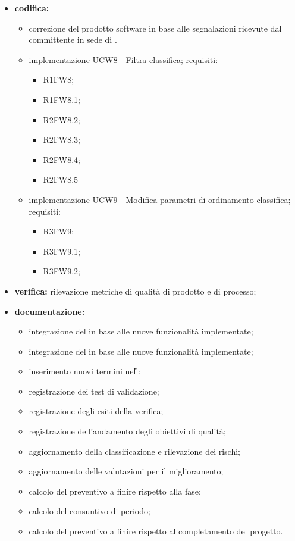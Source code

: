 \begin{itemize}
	\item \textbf{codifica:}
			\begin{itemize}
				\item correzione del prodotto software in base alle segnalazioni ricevute dal committente in sede di \PB{}.
				\item implementazione UCW8 - Filtra classifica; requisiti:
					\begin{itemize}
						\item R1FW8;
						\item R1FW8.1;
						\item R2FW8.2;
						\item R2FW8.3;
						\item R2FW8.4;
      					\item R2FW8.5
					\end{itemize}
				\item implementazione UCW9 - Modifica parametri di ordinamento classifica; requisiti:
					\begin{itemize}
						\item R3FW9;
						\item R3FW9.1;
						\item R3FW9.2;
					\end{itemize}
			\end{itemize}
 	\item \textbf{verifica:} rilevazione metriche di qualità di prodotto e di processo;
	\item \textbf{documentazione:} 
	 \begin{itemize}
		\item integrazione del \MU{} in base alle nuove funzionalità implementate;
  		\item integrazione del \MS{} in base alle nuove funzionalità implementate;
		  \item inserimento nuovi termini nel \G{};
  		\item registrazione dei test di validazione;
    	\item registrazione degli esiti della verifica;
     	\item registrazione dell’andamento degli obiettivi di qualità;
      	\item aggiornamento della classificazione e rilevazione dei rischi;
		\item aggiornamento delle valutazioni per il miglioramento; 
		\item calcolo del preventivo a finire rispetto alla fase;
  		\item calcolo del consuntivo di periodo;
		\item calcolo del preventivo a finire rispetto al completamento del progetto.
	 \end{itemize}
\end{itemize}
